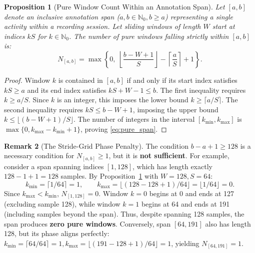 \documentclass[11pt,a4paper]{article}
\newtheorem{proposition}{Proposition}[section]
\theoremstyle{definition}
\newtheorem{remark}[proposition]{Remark}
\begin{document}
\begin{proposition}[Pure Window Count Within an Annotation Span]\label{prop:pure_span_count}
Let $[a, b]$ denote an inclusive annotation span ($a, b \in \mathbb{N}_0, b \ge a$) representing a single activity within a recording session. Let sliding windows of length $W$ start at indices $kS$ for $k \in \mathbb{N}_0$. The number of pure windows falling strictly within $[a, b]$ is:
\begin{equation}\label{eq:pure_span}
N_{[a, b]} = \max\left\{0, \; \left\lfloor \frac{b - W + 1}{S} \right\rfloor - \left\lceil \frac{a}{S} \right\rceil + 1 \right\}.
\end{equation}
\end{proposition}
\begin{proof}
Window $k$ is contained in $[a, b]$ if and only if its start index satisfies $kS \ge a$ and its end index satisfies $kS + W - 1 \le b$. The first inequality requires $k \ge a/S$. Since $k$ is an integer, this imposes the lower bound $k \ge \lceil a/S \rceil$. The second inequality requires $kS \le b - W + 1$, imposing the upper bound $k \le \lfloor (b - W + 1)/S \rfloor$. The number of integers in the interval $[k_{\min}, k_{\max}]$ is $\max\{0, k_{\max} - k_{\min} + 1\}$, proving \eqref{eq:pure_span}.
\end{proof}

\begin{remark}[The Stride-Grid Phase Penalty]
The condition $b - a + 1 \ge 128$ is a necessary condition for $N_{[a,b]} \ge 1$, but it is \textbf{not sufficient}. For example, consider a span spanning indices $[1, 128]$, which has length exactly $128 - 1 + 1 = 128$ samples. By Proposition~\ref{prop:pure_span_count} with $W=128, S=64$:
\begin{equation*}
k_{\min} = \lceil 1/64 \rceil = 1, \qquad k_{\max} = \lfloor (128 - 128 + 1)/64 \rfloor = \lfloor 1/64 \rfloor = 0.
\end{equation*}
Since $k_{\max} < k_{\min}$, $N_{[1, 128]} = 0$. Window $k=0$ begins at 0 and ends at 127 (excluding sample 128), while window $k=1$ begins at 64 and ends at 191 (including samples beyond the span). Thus, despite spanning 128 samples, the span produces \textbf{zero pure windows}.
Conversely, span $[64, 191]$ also has length 128, but its phase aligns perfectly: $k_{\min} = \lceil 64/64 \rceil = 1, k_{\max} = \lfloor (191 - 128 + 1)/64 \rfloor = 1$, yielding $N_{[64, 191]} = 1$.
\end{remark}
\end{document}
